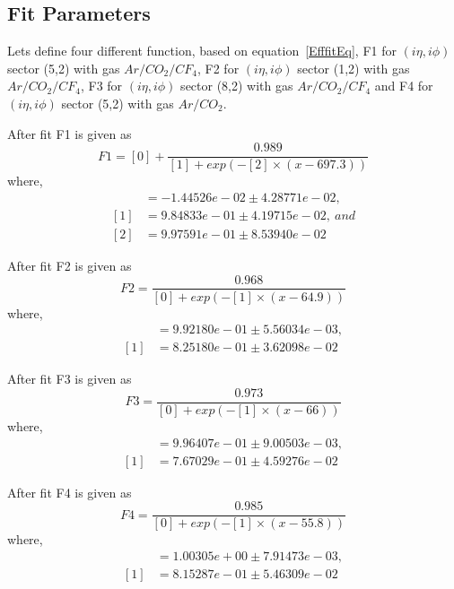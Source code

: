 \subsection{Fit Parameters} %
\label{sub:fit_parameters}
Lets define four different function, based on equation~\ref{EfffitEq}, F1 for $(i\eta,i\phi)$ sector (5,2) with gas $Ar/CO_2/CF_4$, F2 for $(i\eta,i\phi)$ sector (1,2) with gas $Ar/CO_2/CF_4$, F3 for $(i\eta,i\phi)$ sector (8,2) with gas $Ar/CO_2/CF_4$ and F4 for $(i\eta,i\phi)$ sector (5,2) with gas $Ar/CO_2$.

After fit F1 is given as
\begin{equation}
	F1 = [0] + \frac{0.989}{[1]+exp(-[2]\times(x-697.3))}
\end{equation}
where,
\begin{align*}
[0] &= -1.44526e-02 \pm 4.28771e-02,\\
[1] &= 9.84833e-01 \pm 4.19715e-02,~and \\
[2] &= 9.97591e-01 \pm 8.53940e-02
\end{align*}

After fit F2 is given as
\begin{equation}
	F2 = \frac{0.968}{[0]+exp(-[1]\times(x-64.9))}
\end{equation}
where,
\begin{align*}
[0] &= 9.92180e-01 \pm 5.56034e-03,\\
[1] &= 8.25180e-01 \pm 3.62098e-02
\end{align*} 

After fit F3 is given as
\begin{equation}
	F3 = \frac{0.973}{[0]+exp(-[1]\times(x-66))}
\end{equation}
where,
\begin{align*}
[0] &= 9.96407e-01 \pm 9.00503e-03, \\
[1] &= 7.67029e-01 \pm 4.59276e-02
\end{align*}


After fit F4 is given as
\begin{equation}
	F4 = \frac{0.985}{[0]+exp(-[1]\times(x-55.8))}
\end{equation}
where,
\begin{align*}
[0] &= 1.00305e+00 \pm 7.91473e-03,\\
[1] &= 8.15287e-01 \pm 5.46309e-02
\end{align*}
